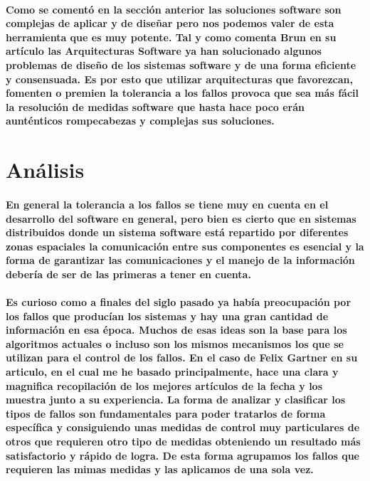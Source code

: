 \documentclass{./llncs2e/llncs}
\begin{document}
\paragraph{
Como se coment\'{o} en la secci\'{o}n anterior las soluciones software son complejas de aplicar y de diseñar pero nos podemos valer de esta herramienta que es muy potente. Tal y como comenta Brun \cite{Brun} en su art\'{i}culo las Arquitecturas Software ya han solucionado algunos problemas de diseño de los sistemas software y de una forma eficiente y consensuada. Es por esto que utilizar arquitecturas que favorezcan, fomenten o premien la tolerancia a los fallos provoca que sea m\'{a}s f\'{a}cil la resoluci\'{o}n de medidas software que hasta hace poco er\'{a}n aunt\'{e}nticos rompecabezas y complejas sus soluciones.
}

\section{An\'{a}lisis}
\paragraph{
En general la tolerancia a los fallos se tiene muy en cuenta en el desarrollo del software en general, pero bien es cierto que en sistemas distribuidos donde un sistema software est\'{a} repartido por diferentes zonas espaciales la comunicaci\'{o}n entre sus componentes es esencial y la forma de garantizar las comunicaciones y el manejo de la informaci\'{o}n deber\'{i}a de ser de las primeras a tener en cuenta.
}

\paragraph{
Es curioso como a finales del siglo pasado ya hab\'{i}a preocupaci\'{o}n por los fallos que produc\'{i}an los sistemas y hay una gran cantidad de informaci\'{o}n en esa \'{e}poca. Muchos de esas ideas son la base para los algoritmos actuales o incluso son los mismos mecanismos los que se utilizan para el control de los fallos. En el caso de Felix Gartner en su articulo, en el cual me he basado principalmente, hace una clara y magnifica recopilaci\'{o}n de los mejores art\'{i}culos de la fecha y los muestra junto a su experiencia. 
La forma de analizar y clasificar los tipos de fallos son fundamentales para poder tratarlos de forma espec\'{i}fica y consiguiendo unas medidas de control muy particulares de otros que requieren otro tipo de medidas obteniendo un resultado m\'{a}s satisfactorio y r\'{a}pido de logra. De esta forma agrupamos los fallos que requieren las mimas medidas y las aplicamos de una sola vez.  
}
\end{document}

